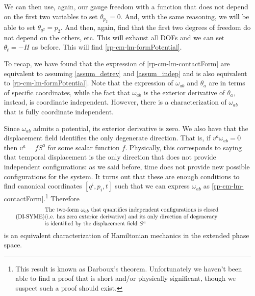 We can then use, again, our gauge freedom with a function that does not depend on the first two variables to set $\theta_{p_2} = 0$. And, with the same reasoning, we will be able to set $\theta_{q^2} = p_2$. And then, again, find that the first two degrees of freedom do not depend on the others, etc. This will exhaust all DOFs and we can set $\theta_t = -H$ as before. This will find \ref{rp-cm-lm-formPotential}.

To recap, we have found that the expression of \ref{rp-cm-lm-contactForm} are equivalent to assuming \ref{assum_detrev} and \ref{assum_indep} and is also equivalent to \ref{rp-cm-lm-formPotential}. Note that the expression of $\omega_{ab}$ and $\theta_a$ are in terms of specific coordinates, while the fact that $\omega_{ab}$ is the exterior derivative of $\theta_a$, instead, is coordinate independent. However, there is a characterization of $\omega_{ab}$ that is fully coordinate independent.

Since $\omega_{ab}$ admits a potential, its exterior derivative is zero. We also have that the displacement field identifies the only degenerate direction. That is, if $v^a\omega_{ab} = 0$ then $v^a = f S^a$ for some scalar function $f$. Physically, this corresponds to saying that temporal displacement is the only direction that does not provide independent configurations: as we said before, time does not provide new possible configurations for the system. It turns out that these are enough conditions to find canonical coordinates $[ q^i, p_i, t]$ such that we can express $\omega_{ab}$ as \ref{rp-cm-lm-contactForm}.\footnote{This result is known as Darboux's theorem. Unfortunately we haven't been able to find a proof that is short and/or physically significant, though we suspect such a proof should exist.} Therefore
\begin{equation}\label{rp-cm-lm-condSymplecticFormDef}
	\tag{DI-SYME}
	\parbox{5in}{The two-form $\omega_{ab}$ that quantifies independent configurations is closed \\ (i.e. has zero exterior derivative)  and its only direction of degeneracy \\ is identified by the displacement field $S^a$}
\end{equation}
is an equivalent characterization of Hamiltonian mechanics in the extended phase space.

